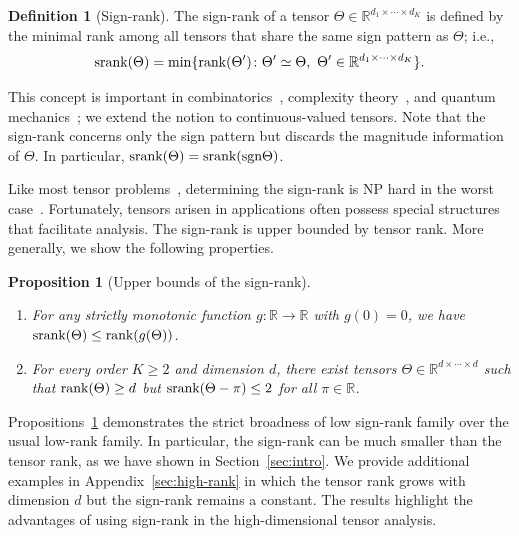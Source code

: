 \documentclass{article}
\theoremstyle{plain}
\newtheorem{prop}{Proposition}
\theoremstyle{definition}
\newtheorem{defn}{Definition}
\def\sign{\textup{sgn}}
\def\srank{\textup{srank}}
\def\rank{\textup{rank}}
\begin{document}
\vspace{.1cm}
\begin{defn}[Sign-rank]
The sign-rank of a tensor $\Theta\in\mathbb{R}^{d_1\times \cdots \times d_K}$ is defined by the minimal rank among all tensors that share the same sign pattern as $\Theta$; i.e.,
\[
\srank(\Theta) = \min \{\rank(\Theta')\colon  \Theta'\simeq \Theta,\ \Theta'\in\mathbb{R}^{d_1\times \cdots \times d_K}\}.
\]
\end{defn}
This concept is important in combinatorics~\citep{cohn2013fast}, complexity theory~\citep{alon2016sign}, and quantum mechanics~\citep{de2003nondeterministic}; we extend the notion to continuous-valued tensors. Note that the sign-rank concerns only the sign pattern but discards the magnitude information of $\Theta$. In particular, $\srank(\Theta)=\srank(\sign \Theta)$. 

Like most tensor problems~\citep{hillar2013most}, determining the sign-rank is NP hard in the worst case~\citep{alon2016sign}. Fortunately, tensors arisen in applications often possess special structures that facilitate analysis. The sign-rank is upper bounded by tensor rank. More generally, we show the following properties.
\vspace{.1cm}
\begin{prop}[Upper bounds of the sign-rank]~\label{cor:monotonic} \hfill
\begin{enumerate}[label={2.\arabic*},wide, labelwidth=!, labelindent=0pt,itemsep=0ex,parsep=0ex,topsep=-7pt]
\item[(a)] [Upper bounds] For any strictly monotonic function $g\colon \mathbb{R}\to \mathbb{R}$ with $g(0)=0$,  we have $\textup{srank}(\Theta)\leq\rank(g(\Theta))$.
\item[(b)] [Broadness] For every order $K\geq 2$ and dimension $d$, there exist tensors $\Theta\in\mathbb{R}^{d\times \cdots \times d}$ such that $\rank(\Theta)\geq d$ but $\srank(\Theta-\pi)\leq 2$ for all $\pi\in\mathbb{R}$.  
\end{enumerate}
\end{prop}
Propositions~\ref{cor:monotonic} demonstrates the strict broadness of low sign-rank family over the usual low-rank family. 
In particular, the sign-rank can be much smaller than the tensor rank, as we have shown in Section~\ref{sec:intro}. We provide additional examples in Appendix~\ref{sec:high-rank} in which the tensor rank grows with dimension $d$ but the sign-rank remains a constant. The results highlight the advantages of using sign-rank in the high-dimensional tensor analysis. 
\end{document}
